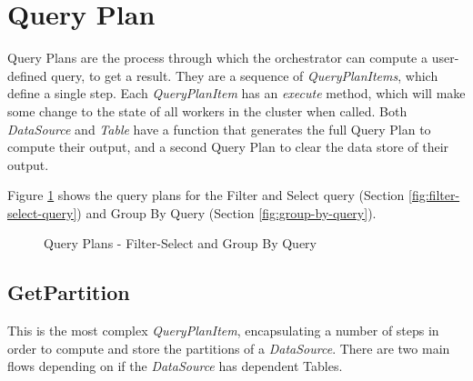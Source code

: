 \section{Query Plan}
Query Plans are the process through which the orchestrator can compute a user-defined query, to get a result. They are a sequence of \textit{QueryPlanItems}, which define a single step. Each \textit{QueryPlanItem} has an \textit{execute} method, which will make some change to the state of all workers in the cluster when called. Both \textit{DataSource} and \textit{Table} have a function that generates the full Query Plan to compute their output, and a second Query Plan to clear the data store of their output. 

Figure \ref{fig:filter-group-by-query-plan} shows the query plans for the Filter and Select query (Section \ref{fig:filter-select-query}) and Group By Query (Section \ref{fig:group-by-query}).

\begin{figure}[h]
	\centering
	\qquad
	\caption{Query Plans - Filter-Select and Group By Query}%
	\label{fig:filter-group-by-query-plan}
\end{figure}

\subsection{GetPartition}\label{subsec:get-partition}
This is the most complex \textit{QueryPlanItem}, encapsulating a number of steps in order to compute and store the partitions of a \textit{DataSource}. There are two main flows depending on if the \textit{DataSource} has dependent Tables.

